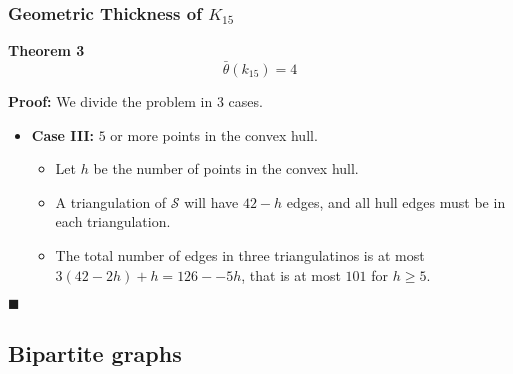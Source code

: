 \documentclass[12 pt]{beamer}
\begin{document}
\begin{frame}{}
    \frametitle{Geometric Thickness of $K_{15}$}
    
    \begin{block}{\textbf{Theorem 3}}
    $$\bar{\theta} (k_{15}) = 4 $$
    \end{block}

    \textbf{Proof:}
    We divide the problem in $3$ cases.
    
    \begin{itemize}
    \item \textbf{Case III:} $5$ or more points in the convex hull. 
        \begin{itemize}
            \item Let $h$ be the number of points in the convex hull.
            \item A triangulation of $\mathcal{S}$ will have $42 - h$ edges, and all hull edges must be in each triangulation.
            \item The total number of edges in three triangulatinos is at most $3(42 -  2h) + h = 126 - -5h$, that is at most $101$ for $h \geq 5$.
        \end{itemize}
    \end{itemize}
    
    \begin{flushright}
    $\blacksquare$
    \end{flushright}
\end{frame} 

    \subsection{Bipartite graphs}
    
\end{document}
